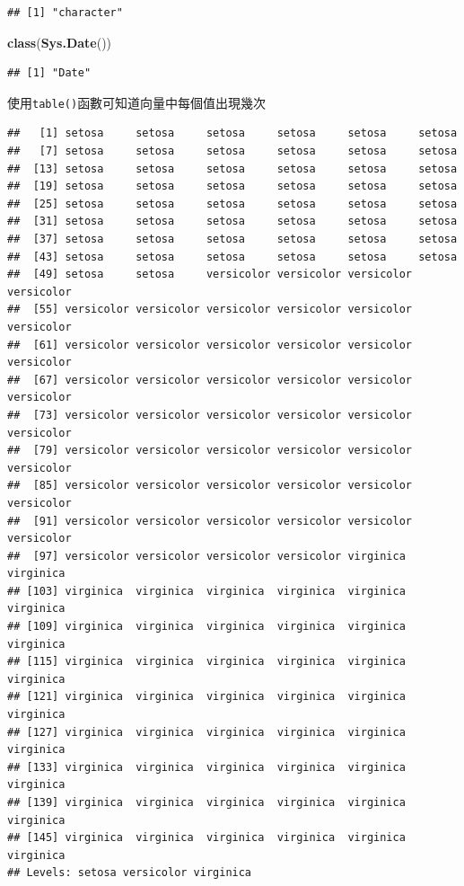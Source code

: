 \documentclass[]{book}
\newenvironment{Shaded}{\begin{snugshade}}{\end{snugshade}}
\newcommand{\KeywordTok}[1]{\textcolor[rgb]{0.13,0.29,0.53}{\textbf{{#1}}}}
\newcommand{\NormalTok}[1]{{#1}}
\theoremstyle{definition}
\theoremstyle{definition}
\theoremstyle{remark}
\begin{document}
\begin{verbatim}
## [1] "character"
\end{verbatim}

\begin{Shaded}
\begin{Highlighting}[]
\KeywordTok{class}\NormalTok{(}\KeywordTok{Sys.Date}\NormalTok{())}
\end{Highlighting}
\end{Shaded}

\begin{verbatim}
## [1] "Date"
\end{verbatim}

使用\texttt{table()}函數可知道向量中每個值出現幾次

\begin{Shaded}
\end{Shaded}

\begin{verbatim}
##   [1] setosa     setosa     setosa     setosa     setosa     setosa    
##   [7] setosa     setosa     setosa     setosa     setosa     setosa    
##  [13] setosa     setosa     setosa     setosa     setosa     setosa    
##  [19] setosa     setosa     setosa     setosa     setosa     setosa    
##  [25] setosa     setosa     setosa     setosa     setosa     setosa    
##  [31] setosa     setosa     setosa     setosa     setosa     setosa    
##  [37] setosa     setosa     setosa     setosa     setosa     setosa    
##  [43] setosa     setosa     setosa     setosa     setosa     setosa    
##  [49] setosa     setosa     versicolor versicolor versicolor versicolor
##  [55] versicolor versicolor versicolor versicolor versicolor versicolor
##  [61] versicolor versicolor versicolor versicolor versicolor versicolor
##  [67] versicolor versicolor versicolor versicolor versicolor versicolor
##  [73] versicolor versicolor versicolor versicolor versicolor versicolor
##  [79] versicolor versicolor versicolor versicolor versicolor versicolor
##  [85] versicolor versicolor versicolor versicolor versicolor versicolor
##  [91] versicolor versicolor versicolor versicolor versicolor versicolor
##  [97] versicolor versicolor versicolor versicolor virginica  virginica 
## [103] virginica  virginica  virginica  virginica  virginica  virginica 
## [109] virginica  virginica  virginica  virginica  virginica  virginica 
## [115] virginica  virginica  virginica  virginica  virginica  virginica 
## [121] virginica  virginica  virginica  virginica  virginica  virginica 
## [127] virginica  virginica  virginica  virginica  virginica  virginica 
## [133] virginica  virginica  virginica  virginica  virginica  virginica 
## [139] virginica  virginica  virginica  virginica  virginica  virginica 
## [145] virginica  virginica  virginica  virginica  virginica  virginica 
## Levels: setosa versicolor virginica
\end{verbatim}
\end{document}
